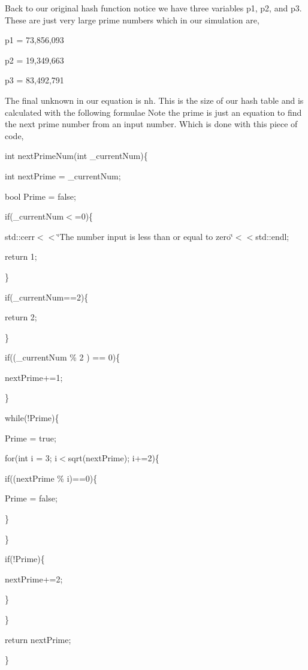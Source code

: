  Back to our original hash function notice we have three variables p1, p2, and p3. These are just very large prime numbers which in our simulation are,\par
 p1 = 73,856,093\par
 p2 = 19,349,663\par
 p3 = 83,492,791\par


The final unknown in our equation is nh. This is the size of our hash table and is calculated with the following formulae  Note the prime is just an equation to find the next prime number from an input number. Which is done with this piece of code,\par
\par
 int next\-Prime\-Num(int \-\_\-current\-Num)\{\par
 int next\-Prime = \-\_\-current\-Num;\par
 bool Prime = false;\par
 if(\-\_\-current\-Num$<$=0)\{\par
 std\-::cerr$<$$<$\char`\"{}\-The number input is less than or equal to zero\char`\"{}$<$$<$std\-::endl;\par
 return 1;\par
 \}\par
 if(\-\_\-current\-Num==2)\{\par
 return 2;\par
 \}\par
 if((\-\_\-current\-Num \% 2 ) == 0)\{\par
 next\-Prime+=1;\par
 \}\par
 while(!\-Prime)\{\par
 Prime = true;\par
 for(int i = 3; i$<$sqrt(next\-Prime); i+=2)\{\par
 if((next\-Prime \% i)==0)\{\par
 Prime = false;\par
 \}\par
 \}\par
 if(!\-Prime)\{\par
 next\-Prime+=2;\par
 \}\par
 \}\par
 return next\-Prime;\par
 \}\par
 \par
